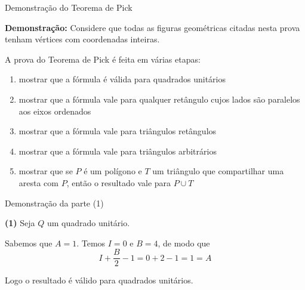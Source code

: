 \begin{frame}[fragile]{Demonstração do Teorema de Pick}

    \textbf{Demonstração:} Considere que todas as figuras geométricas citadas nesta prova
         tenham vértices com coordenadas inteiras.

        A prova do Teorema de Pick é feita em várias etapas:
        \begin{enumerate}[(1)]
            \item mostrar que a fórmula é válida para quadrados unitários
            \item mostrar que a fórmula vale para qualquer retângulo cujos lados são paralelos
                aos eixos ordenados
            \item mostrar que a fórmula vale para triângulos retângulos
            \item mostrar que a fórmula vale para triângulos arbitrários
            \item mostrar que se $P$ é um polígono e $T$ um triângulo que compartilhar uma
                aresta com $P$, então o resultado vale para $P\cup T$
        \end{enumerate}
\end{frame}

\begin{frame}[fragile]{Demonstração da parte (1)}

    \textbf{(1)} Seja $Q$ um quadrado unitário.

    \begin{figure}
        \centering

    \end{figure}

    Sabemos que $A = 1$. Temos $I = 0$ e $B = 4$, de modo que
    \[
         I + \frac{B}{2} - 1 = 0 + 2 - 1 = 1 = A
    \]

    Logo o resultado é válido para quadrados unitários.
\end{frame}

